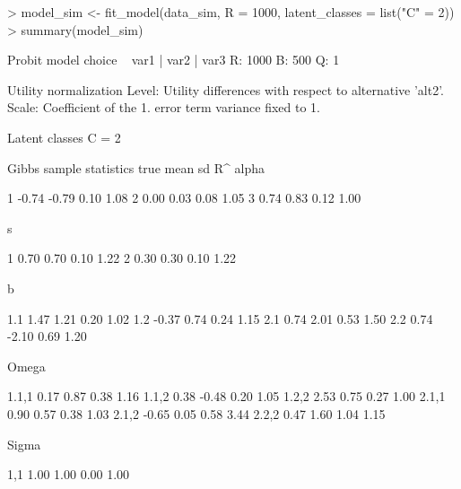 \documentclass[article]{jss}
\begin{document}
\begin{Schunk}
\begin{Sinput}
> model_sim <- fit_model(data_sim, R = 1000, latent_classes = list("C" = 2))
> summary(model_sim)
\end{Sinput}
\begin{Soutput}
Probit model
choice ~ var1 | var2 | var3 
R: 1000 
B: 500 
Q: 1 

Utility normalization
Level: Utility differences with respect to alternative 'alt2'.
Scale: Coefficient of the 1. error term variance fixed to 1.

Latent classes
C = 2 

Gibbs sample statistics
          true    mean      sd      R^
 alpha
                                      
     1   -0.74   -0.79    0.10    1.08
     2    0.00    0.03    0.08    1.05
     3    0.74    0.83    0.12    1.00

 s
                                      
     1    0.70    0.70    0.10    1.22
     2    0.30    0.30    0.10    1.22

 b
                                      
   1.1    1.47    1.21    0.20    1.02
   1.2   -0.37    0.74    0.24    1.15
   2.1    0.74    2.01    0.53    1.50
   2.2    0.74   -2.10    0.69    1.20

 Omega
                                      
 1.1,1    0.17    0.87    0.38    1.16
 1.1,2    0.38   -0.48    0.20    1.05
 1.2,2    2.53    0.75    0.27    1.00
 2.1,1    0.90    0.57    0.38    1.03
 2.1,2   -0.65    0.05    0.58    3.44
 2.2,2    0.47    1.60    1.04    1.15

 Sigma
                                      
   1,1    1.00    1.00    0.00    1.00
\end{Soutput}
\end{Schunk}
\end{document}
